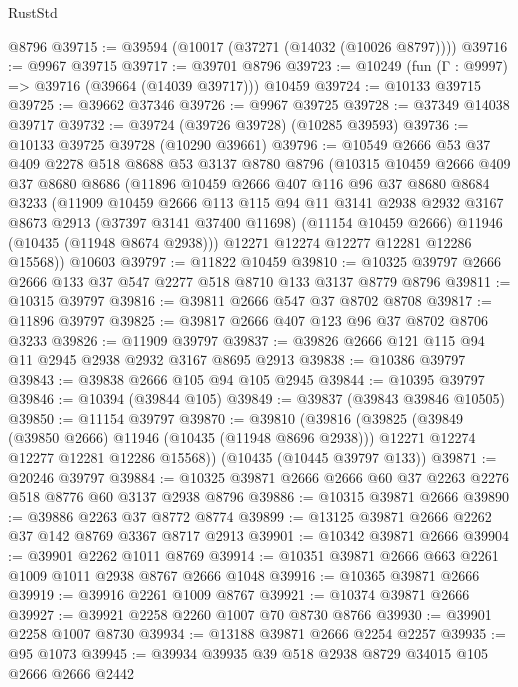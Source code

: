 \begin{lexlean}{RustStd}
\begin{coremodule}
    @8796
@39715 := @39594 (@10017 (@37271 (@14032 (@10026 @8797))))
@39716 := @9967 @39715
@39717 := @39701 @8796
@39723 := @10249 (fun (Γ : @9997) => @39716 (@39664 (@14039 @39717))) @10459
@39724 := @10133 @39715
@39725 := @39662 @37346
@39726 := @9967 @39725
@39728 := @37349 @14038 @39717
@39732 := @39724 (@39726 @39728) (@10285 @39593)
@39736 := @10133 @39725 @39728 (@10290 @39661)
@39796 := @10549
    @2666
    @53
    @37
    @409
    @2278
    @518
    @8688
    @53
    @3137
    @8780
    @8796
    (@10315
      @10459
      @2666
      @409
      @37
      @8680
      @8686
      (@11896
        @10459
        @2666
        @407
        @116
        @96
        @37
        @8680
        @8684
        @3233
        (@11909
          @10459
          @2666
          @113
          @115
          @94
          @11
          @3141
          @2938
          @2932
          @3167
          @8673
          @2913
          (@37397 @3141 @37400 @11698)
          (@11154 @10459 @2666)
          @11946
          (@10435 (@11948 @8674 @2938)))
        @12271
        @12274
        @12277
        @12281
        @12286
        @15568))
    @10603
@39797 := @11822 @10459
@39810 := @10325 @39797 @2666 @2666 @133 @37 @547 @2277 @518 @8710 @133 @3137 @8779 @8796
@39811 := @10315 @39797
@39816 := @39811 @2666 @547 @37 @8702 @8708
@39817 := @11896 @39797
@39825 := @39817 @2666 @407 @123 @96 @37 @8702 @8706 @3233
@39826 := @11909 @39797
@39837 := @39826 @2666 @121 @115 @94 @11 @2945 @2938 @2932 @3167 @8695 @2913
@39838 := @10386 @39797
@39843 := @39838 @2666 @105 @94 @105 @2945
@39844 := @10395 @39797
@39846 := @10394 (@39844 @105)
@39849 := @39837 (@39843 @39846 @10505)
@39850 := @11154 @39797
@39870 := @39810
    (@39816
      (@39825
        (@39849 (@39850 @2666) @11946 (@10435 (@11948 @8696 @2938)))
        @12271
        @12274
        @12277
        @12281
        @12286
        @15568))
    (@10435 (@10445 @39797 @133))
@39871 := @20246 @39797
@39884 := @10325 @39871 @2666 @2666 @60 @37 @2263 @2276 @518 @8776 @60 @3137 @2938 @8796
@39886 := @10315 @39871 @2666
@39890 := @39886 @2263 @37 @8772 @8774
@39899 := @13125 @39871 @2666 @2262 @37 @142 @8769 @3367 @8717 @2913
@39901 := @10342 @39871 @2666
@39904 := @39901 @2262 @1011 @8769
@39914 := @10351 @39871 @2666 @663 @2261 @1009 @1011 @2938 @8767 @2666 @1048
@39916 := @10365 @39871 @2666
@39919 := @39916 @2261 @1009 @8767
@39921 := @10374 @39871 @2666
@39927 := @39921 @2258 @2260 @1007 @70 @8730 @8766
@39930 := @39901 @2258 @1007 @8730
@39934 := @13188 @39871 @2666 @2254 @2257
@39935 := @95 @1073
@39945 := @39934 @39935 @39 @518 @2938 @8729 @34015 @105 @2666 @2666 @2442

\end{coremodule}
\end{lexlean}
